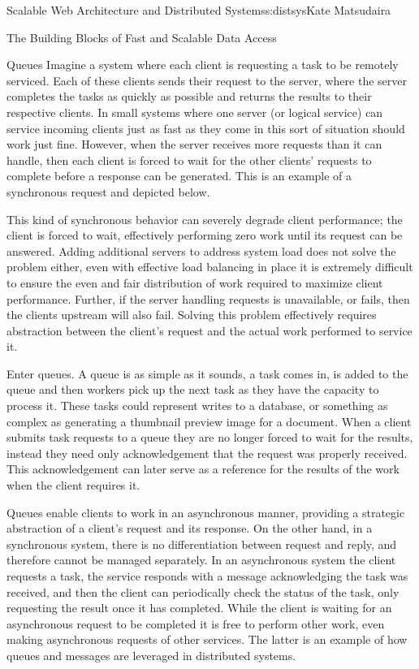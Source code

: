 \begin{aosachapter}{Scalable Web Architecture and Distributed Systems}{s:distsys}{Kate Matsudaira}
\begin{aosasect1}{The Building Blocks of Fast and Scalable Data Access}
\begin{aosasect2}{Queues}
Imagine a system where each client is requesting a task to be remotely
serviced. Each of these clients sends their request to the server,
where the server completes the tasks as quickly as possible and
returns the results to their respective clients. In small systems
where one server (or logical service) can service incoming clients
just as fast as they come in this sort of situation should work just
fine. However, when the server receives more requests than it can
handle, then each client is forced to wait for the other clients'
requests to complete before a response can be generated. This is an
example of a synchronous request and depicted below.


This kind of synchronous behavior can severely degrade client
performance; the client is forced to wait, effectively performing zero
work until its request can be answered. Adding additional servers to
address system load does not solve the problem either, even with
effective load balancing in place it is extremely difficult to ensure
the even and fair distribution of work required to maximize client
performance. Further, if the server handling requests is unavailable,
or fails, then the clients upstream will also fail. Solving this
problem effectively requires abstraction between the client's request
and the actual work performed to service it.

Enter queues. A queue is as simple as it sounds, a task comes in, is
added to the queue and then workers pick up the next task as they have
the capacity to process it. These tasks could represent writes to a
database, or something as complex as generating a thumbnail preview
image for a document. When a client submits task requests to a queue
they are no longer forced to wait for the results, instead they need
only acknowledgement that the request was properly received. This
acknowledgement can later serve as a reference for the results of the
work when the client requires it.

Queues enable clients to work in an asynchronous manner, providing a
strategic abstraction of a client's request and its response. On the
other hand, in a synchronous system, there is no differentiation
between request and reply, and therefore cannot be managed
separately. In an asynchronous system the client requests a task, the
service responds with a message acknowledging the task was received,
and then the client can periodically check the status of the task,
only requesting the result once it has completed. While the client is
waiting for an asynchronous request to be completed it is free to
perform other work, even making asynchronous requests of other
services. The latter is an example of how queues and messages are
leveraged in distributed systems.


\end{aosasect2}
\end{aosasect1}
\end{aosachapter}
